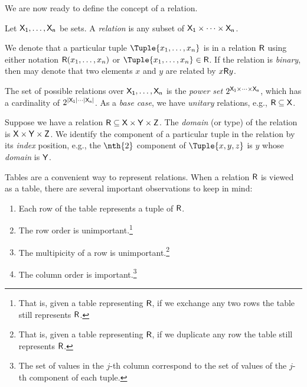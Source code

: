 \documentclass[11pt,final,hidelinks]{article}
\begin{document}
We are now ready to define the concept of a relation.
\begin{definition}[Relation]
Let $\Set{X}[1],\ldots,\Set{X}[n]$ be sets. A \emph{relation} is any subset of $\Set{X}[1] \times \cdots \times \Set{X}[n]$.
\end{definition}
We denote that a particular tuple $\Tuple{x_1,\ldots,x_n}$ is in a relation $\Relation{R}$ using either notation $\Relation{R}(x_1,\ldots,x_n)$ or $\Tuple{x_1,\ldots,x_n} \in \Set{R}$. If the relation is \emph{binary}, then may denote that two elements $x$ and $y$ are related by $x \Relation{R} y$.

The set of possible relations over $\Set{X}[1],\ldots,\Set{X}[n]$ is the \emph{power set} $\PS{\Set{X}[1] \times \cdots \times \Set{X}[n]}$, which has a cardinality of $2^{\Card{\Set{X}[1]} \cdots \Card{\Set{X}[n]}}$. As a \emph{base case}, we have \emph{unitary} relations, e.g., $\Relation{R} \subseteq \Set{X}$.

Suppose we have a relation $\Relation{R} \subseteq \Set{X} \times \Set{Y} \times \Set{Z}$.
The \emph{domain} (or type) of the relation is $\Set{X} \times \Set{Y} \times \Set{Z}$.
We identify the component of a particular tuple in the relation by its \emph{index} position, e.g., the $\nth{2}$ component of $\Tuple{x,y,z}$ is $y$ whose \emph{domain} is $\Set{Y}$.

Tables are a convenient way to represent relations. When a relation $\Relation{R}$ is viewed as a table, there are several important observations to keep in mind:
\begin{enumerate}
\item Each row of the table represents a tuple of $\Relation{R}$.
\item The row order is unimportant.\footnote{That is, given a table representing $\Relation{R}$, if we exchange any two rows the table still represents $\Relation{R}$.}
\item The multipicity of a row is unimportant.\footnote{That is, given a table representing $\Relation{R}$, if we duplicate any row the table still represents $\Relation{R}$.}
\item The column order is important.\footnote{The set of values in the $j$-th column correspond to the set of values of the $j$-th component of each tuple.}
\end{enumerate}
\end{document}

